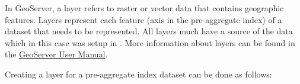 
In GeoServer, a layer refers to raster or vector data that contains
geographic features. Layers represent each feature (axis in the
pre-aggregate index) of a dataset that needs to be represented. All layers
much have a source of the data which in this case was setup in
. More information about layers can be found in the
\href{http://docs.geoserver.org/stable/en/user/webadmin/data/layers.html}{GeoServer
User Manual}. 

Creating a layer for a pre-aggregate index dataset can be done as follows:

